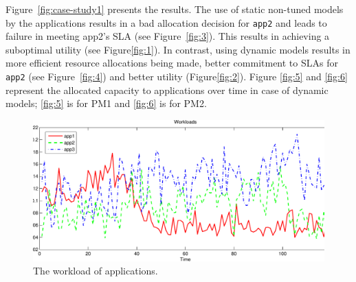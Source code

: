 Figure~\ref{fig:case-study1} presents the results. The use of static non-tuned models by the
applications results in a bad allocation decision for \texttt{app2} and leads to failure in meeting app2's SLA (see Figure~\ref{fig:3}).
This results in achieving a suboptimal utility (see Figure\ref{fig:1}).  
In contrast, using dynamic models results in more efficient resource allocations being made, better commitment to SLAs for \texttt{app2} (see Figure~\ref{fig:4}) and better utility (Figure\ref{fig:2}). Figure \ref{fig:5} and \ref{fig:6} represent the allocated capacity to applications over time in case of dynamic models; \ref{fig:5} is for PM1 and \ref{fig:6} is for PM2.     
 
\begin{figure}
	\centering
 \includegraphics[width=1\textwidth]{image/centralized1/exp_simple_deploy-workload} 
\caption[A sample workload for the applications in a private cloud.]{The workload of applications. }
\label{fig:7}
\end{figure}

